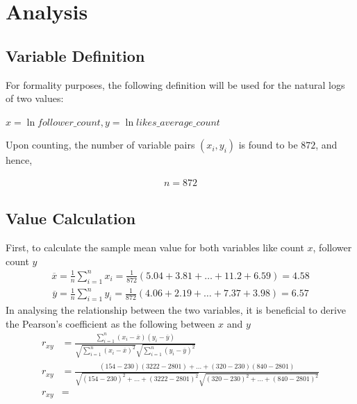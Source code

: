 \documentclass[11pt]{article}
\begin{document}
\section{Analysis}\label{section-analysis}

\subsection{Variable Definition}
For formality purposes, the following definition will be used for the natural logs of two values:

$x=\ln{\mathit{follower\_count}}, y=\ln{\mathit{likes\_average\_count}}$

Upon counting, the number of variable pairs $ \left( x _ { i }, y _ { i } \right)$ is found to be $872$, and hence, 

\begin{align}
{n = 872}
\end{align}

\subsection{Value Calculation}
First, to calculate the sample mean value for both variables like count $x$, follower count $y$
\begin{align}
\overline { x } = \frac { 1 } { n } \sum _ { i = 1 } ^ { n } x _ { i } = \frac { 1 } { 872 } (5.04 + 3.81 + \ldots + 11.2 + 6.59)  { = 4.58}
\end{align}
\begin{align}
\overline { y } = \frac { 1 } { n } \sum _ { i = 1 } ^ { n } y _ { i }  = \frac { 1 } { 872 } (4.06 + 2.19 + \ldots + 7.37 + 3.98)  {= 6.57}
\end{align}
In analysing the relationship between the two variables, it is beneficial to derive the Pearson's coefficient as the following between $x$ and $y$
\begin{align}
r _ { x y } &= \frac { \sum _ { i = 1 } ^ { n } \left( x _ { i } - \overline { x } \right) \left( y _ { i } - \overline { y } \right) } { \sqrt { \sum _ { i = 1 } ^ { n } \left( x _ { i } - \overline { x } \right) ^ { 2 } } \sqrt { \sum _ { i = 1 } ^ { n } \left( y _ { i } - \overline { y } \right) ^ { 2 } } } \\
r _ { x y } &= \frac {\left( 154 - 230 \right) \left( 3222 - 2801\right)  + \ldots + {\left( 320 - 230 \right) \left( 840 - 2801\right) }}  { \sqrt { \left( 154 - 230\right) ^ { 2 }  + \ldots +  \left( 3222 - 2801\right)^{2}} \sqrt { \left( 320 - 230\right) ^ { 2 }  + \ldots +  \left( 840 - 2801\right)^{2}} } \\
r _ { x y } &=
\end{align}
\end{document}
